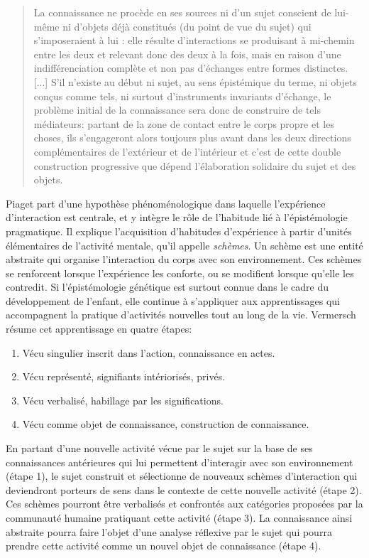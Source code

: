 \begin{quote}
	\og La connaissance ne procède en ses sources ni d’un sujet conscient de lui-même ni d’objets déjà constitués (du point de vue du sujet) qui s’imposeraient à lui : elle résulte d’interactions se produisant à mi-chemin entre les deux et relevant donc des deux à la fois, mais en raison d’une indifférenciation complète et non pas d’échanges entre formes distinctes. [...]  
	S’il n’existe au début ni sujet, au sens épistémique du terme, ni objets conçus comme tels, ni surtout d’instruments invariants d’échange, le problème initial de la connaissance sera donc de construire de tels médiateurs: partant de la zone de contact entre le corps propre et les choses, ils s’engageront alors toujours plus avant dans les deux directions complémentaires de l’extérieur et de l’intérieur et c’est de cette double construction progressive que dépend l’élaboration solidaire du sujet et des objets. \fg\ 
	\cite[p.~14]{piaget_lepistemologie_1970}
\end{quote}


Piaget part d'une hypothèse phénoménologique dans laquelle l'expérience d'interaction est centrale, et y intègre le rôle de l'habitude lié à l'épistémologie pragmatique.
Il explique l'acquisition d'habitudes d'expérience à partir d'unités élémentaires de l’activité mentale, qu'il appelle \emph{schèmes}. 
Un schème est une entité abstraite qui organise l'interaction du corps avec son environnement. 
Ces schèmes se renforcent lorsque l'expérience les conforte, ou se modifient lorsque qu'elle les contredit. 
Si l'épistémologie génétique est surtout connue dans le cadre du développement de l'enfant, elle continue à s'appliquer aux apprentissages qui accompagnent la pratique d'activités nouvelles tout au long de la vie.  
Vermersch \cite{vermersch_problematique_2014} résume cet apprentissage en quatre étapes: 

\begin{enumerate}%
	\item Vécu singulier inscrit dans l'action, connaissance en actes.
	\item Vécu représenté, signifiants intériorisés, privés.
	\item Vécu verbalisé, habillage par les significations.
	\item Vécu comme objet de connaissance, construction de connaissance.
\end{enumerate}

En partant d'une nouvelle activité vécue par le sujet sur la base de ses connaissances antérieures qui lui permettent d'interagir avec son environnement (étape 1), le sujet construit et sélectionne de nouveaux schèmes d'interaction qui deviendront porteurs de sens dans le contexte de cette nouvelle activité (étape 2). 
Ces schèmes pourront être verbalisés et confrontés aux catégories proposées par la communauté humaine pratiquant cette activité (étape 3). 
La connaissance ainsi abstraite pourra faire l’objet d’une analyse réflexive par le sujet qui pourra prendre cette activité comme un nouvel objet de connaissance (étape 4).

